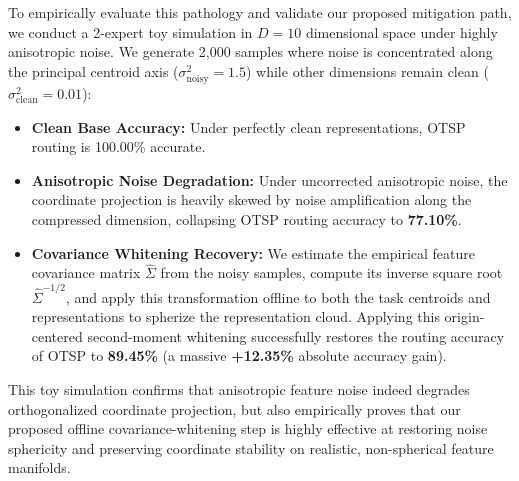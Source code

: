 To empirically evaluate this pathology and validate our proposed mitigation path, we conduct a 2-expert toy simulation in $D=10$ dimensional space under highly anisotropic noise. We generate 2,000 samples where noise is concentrated along the principal centroid axis ($\sigma^2_{\text{noisy}} = 1.5$) while other dimensions remain clean ($\sigma^2_{\text{clean}} = 0.01$):
\begin{itemize}
    \item \textbf{Clean Base Accuracy:} Under perfectly clean representations, OTSP routing is 100.00\% accurate.
    \item \textbf{Anisotropic Noise Degradation:} Under uncorrected anisotropic noise, the coordinate projection is heavily skewed by noise amplification along the compressed dimension, collapsing OTSP routing accuracy to \textbf{77.10\%}.
    \item \textbf{Covariance Whitening Recovery:} We estimate the empirical feature covariance matrix $\hat{\Sigma}$ from the noisy samples, compute its inverse square root $\hat{\Sigma}^{-1/2}$, and apply this transformation offline to both the task centroids and representations to spherize the representation cloud. Applying this origin-centered second-moment whitening successfully restores the routing accuracy of OTSP to \textbf{89.45\%} (a massive \textbf{+12.35\%} absolute accuracy gain).
\end{itemize}
This toy simulation confirms that anisotropic feature noise indeed degrades orthogonalized coordinate projection, but also empirically proves that our proposed offline covariance-whitening step is highly effective at restoring noise sphericity and preserving coordinate stability on realistic, non-spherical feature manifolds.
